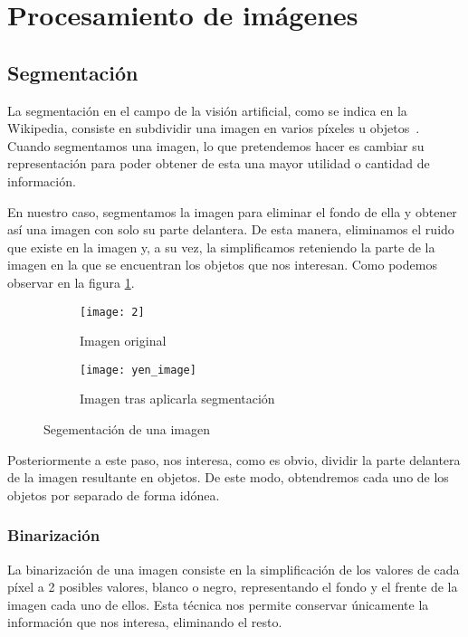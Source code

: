 \section{Procesamiento de imágenes}

\subsection{Segmentación}

La segmentación en el campo de la visión artificial, como se indica en la Wikipedia, consiste en subdividir una imagen en varios píxeles u objetos~\cite{wiki:segmentation}. Cuando segmentamos una imagen, lo que pretendemos hacer es cambiar su representación para poder obtener de esta una mayor utilidad o cantidad de información.

En nuestro caso, segmentamos la imagen para eliminar el fondo de ella y obtener así una imagen con solo su parte delantera. De esta manera, eliminamos el ruido que existe en la imagen y, a su vez, la simplificamos reteniendo la parte de la imagen en la que se encuentran los objetos que nos interesan. Como podemos observar en la figura \ref{fig:3.4.0}.

\begin{figure}
	\centering
	\begin{subfigure}[b]{0.4\textwidth}
        \texttt{[image: 2]}
        \caption{Imagen original}
    \end{subfigure}
    \begin{subfigure}[b]{0.4\textwidth}
        \texttt{[image: yen\_image]}
        \caption{Imagen tras aplicarla segmentación}
    \end{subfigure}
    \caption{Segementación de una imagen}
	\label{fig:3.4.0}
\end{figure}

Posteriormente a este paso, nos interesa, como es obvio, dividir la parte delantera de la imagen resultante en objetos. De este modo, obtendremos cada uno de los objetos por separado de forma idónea.

\subsubsection{Binarización}

La binarización de una imagen consiste en la simplificación de los valores de cada píxel a 2 posibles valores, blanco o negro, representando el fondo y el frente de la imagen cada uno de ellos. Esta técnica nos permite conservar únicamente la información que nos interesa, eliminando el resto.


